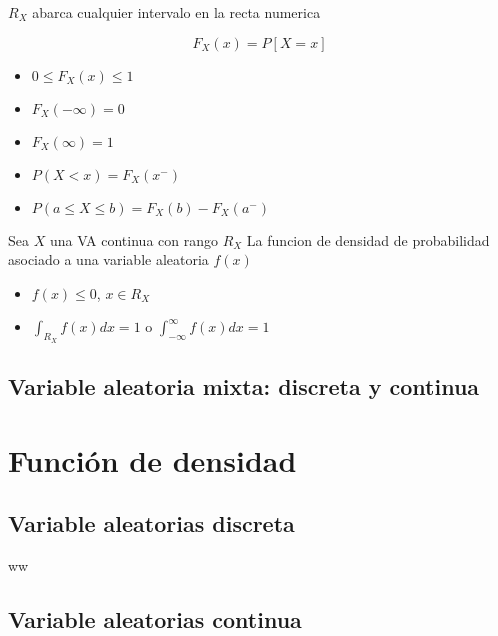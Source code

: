 \documentclass[10pt,]{krantz}
\providecommand{\tightlist}{%
  \setlength{\itemsep}{0pt}\setlength{\parskip}{0pt}}
\theoremstyle{definition}
\theoremstyle{definition}
\theoremstyle{definition}
\theoremstyle{remark}
\let\BeginKnitrBlock\begin \let\EndKnitrBlock\end
\begin{document}
\(R_X\) abarca cualquier intervalo en la recta numerica

\[F_X(x)=P[X=x]\]

\begin{itemize}
\tightlist
\item
  \(0\leq F_X(x)\leq 1\)
\item
  \(F_X(-\infty)=0\)
\item
  \(F_X(\infty)=1\)
\item
  \(P(X<x)=F_X(x^-)\)
\item
  \(P(a\leq X\leq b)=F_X(b)-F_X(a^-)\)
\end{itemize}

Sea \(X\) una VA continua con rango \(R_{X}\)
La funcion de densidad de probabilidad asociado a una variable aleatoria \(f(x)\)

\begin{itemize}
\tightlist
\item
  \(f(x)\leq 0\), \(x\in R_{X}\)
\item
  \(\int_{R_{X}} f(x)dx=1\) o \(\int_{-\infty}^\infty f(x)dx=1\)
\end{itemize}

\hypertarget{variable-aleatoria-mixta-discreta-y-continua}{%
\subsection{Variable aleatoria mixta: discreta y continua}\label{variable-aleatoria-mixta-discreta-y-continua}}

\hypertarget{funciuxf3n-de-densidad}{%
\section{Función de densidad}\label{funciuxf3n-de-densidad}}

\hypertarget{variable-aleatorias-discreta}{%
\subsection{Variable aleatorias discreta}\label{variable-aleatorias-discreta}}

\BeginKnitrBlock{definition}[]
\protect\hypertarget{def:unnamed-chunk-11}{}{\label{def:unnamed-chunk-11} \iffalse () \fi{} }ww
\EndKnitrBlock{definition}

\hypertarget{variable-aleatorias-continua}{%
\subsection{Variable aleatorias continua}\label{variable-aleatorias-continua}}
\end{document}
